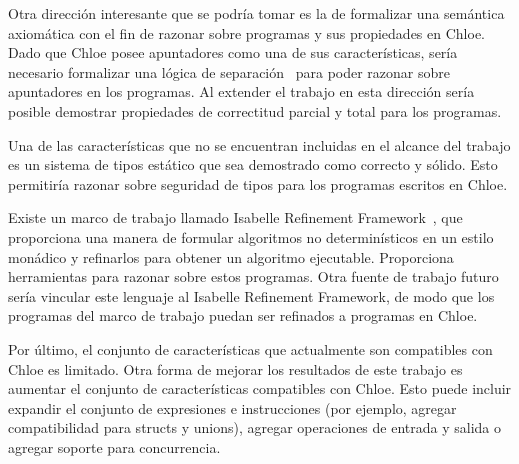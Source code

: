 Otra dirección interesante que se podría tomar es la de formalizar una semántica axiomática con el fin de razonar sobre programas y sus propiedades en Chloe.
Dado que Chloe posee apuntadores como una de sus características, sería necesario formalizar una lógica de separación~\citep{sep-logic} para poder razonar sobre apuntadores en los programas.
Al extender el trabajo en esta dirección sería posible demostrar propiedades de correctitud parcial y total para los programas.

Una de las características que no se encuentran incluidas en el alcance del trabajo es un sistema de tipos estático que sea demostrado como correcto y sólido.
Esto permitiría razonar sobre seguridad de tipos para los programas escritos en Chloe.

Existe un marco de trabajo llamado Isabelle Refinement Framework~\citep{Refine_Monadic-AFP}, que proporciona una manera de formular algoritmos no determinísticos en un estilo monádico y refinarlos para obtener un algoritmo ejecutable.
Proporciona herramientas para razonar sobre estos programas.
Otra fuente de trabajo futuro sería vincular este lenguaje al Isabelle Refinement Framework, de modo que los programas del marco de trabajo puedan ser refinados a programas en Chloe.

Por último, el conjunto de características que actualmente son compatibles con Chloe es limitado.
Otra forma de mejorar los resultados de este trabajo es aumentar el conjunto de características compatibles con Chloe.
Esto puede incluir expandir el conjunto de expresiones e instrucciones (por ejemplo, agregar compatibilidad para structs y unions), agregar operaciones de entrada y salida o agregar soporte para concurrencia.
